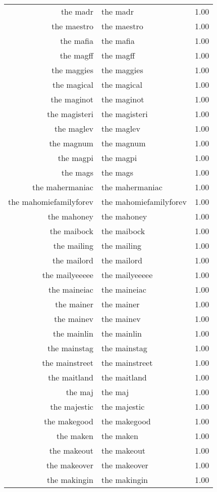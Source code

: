 \begin{table}[ht]
\begin{tabular}{rlr}
  the madr & the madr & 1.00 \\ 
  the maestro & the maestro & 1.00 \\ 
  the mafia & the mafia & 1.00 \\ 
  the magff & the magff & 1.00 \\ 
  the maggies & the maggies & 1.00 \\ 
  the magical & the magical & 1.00 \\ 
  the maginot & the maginot & 1.00 \\ 
  the magisteri & the magisteri & 1.00 \\ 
  the maglev & the maglev & 1.00 \\ 
  the magnum & the magnum & 1.00 \\ 
  the magpi & the magpi & 1.00 \\ 
  the mags & the mags & 1.00 \\ 
  the mahermaniac & the mahermaniac & 1.00 \\ 
  the mahomiefamilyforev & the mahomiefamilyforev & 1.00 \\ 
  the mahoney & the mahoney & 1.00 \\ 
  the maibock & the maibock & 1.00 \\ 
  the mailing & the mailing & 1.00 \\ 
  the mailord & the mailord & 1.00 \\ 
  the mailyeeeee & the mailyeeeee & 1.00 \\ 
  the maineiac & the maineiac & 1.00 \\ 
  the mainer & the mainer & 1.00 \\ 
  the mainev & the mainev & 1.00 \\ 
  the mainlin & the mainlin & 1.00 \\ 
  the mainstag & the mainstag & 1.00 \\ 
  the mainstreet & the mainstreet & 1.00 \\ 
  the maitland & the maitland & 1.00 \\ 
  the maj & the maj & 1.00 \\ 
  the majestic & the majestic & 1.00 \\ 
  the makegood & the makegood & 1.00 \\ 
  the maken & the maken & 1.00 \\ 
  the makeout & the makeout & 1.00 \\ 
  the makeover & the makeover & 1.00 \\ 
  the makingin & the makingin & 1.00 \\ 

\end{tabular}
\end{table}
